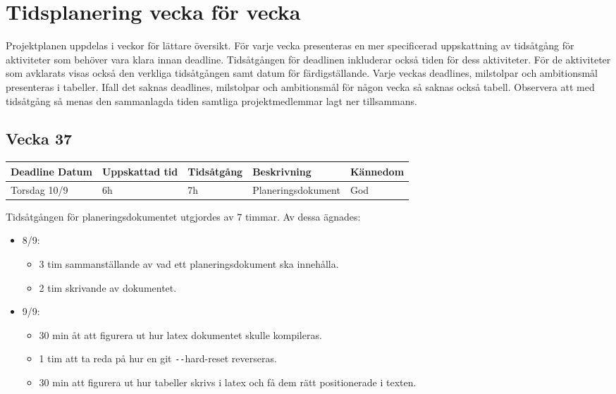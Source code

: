 \documentclass{TDP003mall}
\begin{document}
\section{Tidsplanering vecka för vecka}
Projektplanen uppdelas i veckor för lättare översikt. För varje vecka presenteras
 en mer specificerad uppskattning av tidsåtgång för aktiviteter som behöver vara
 klara innan deadline. Tidsåtgången för deadlinen inkluderar också tiden för dess
 aktiviteter. För de aktiviteter som avklarats visas också den verkliga tidsåtgången
 samt datum för färdigställande. Varje veckas deadlines, milstolpar och ambitionsmål presenteras
 i tabeller. Ifall det saknas deadlines, milstolpar och ambitionsmål för någon vecka så saknas också tabell. Observera att med tidsåtgång så menas den sammanlagda tiden samtliga projektmedlemmar lagt ner tillsammans.

\subsection{Vecka 37}
\begin{tabularx}{\linewidth}{|l|l|l|X|l|}
	\hline
	Deadline Datum & Uppskattad tid & Tidsåtgång & Beskrivning        & Kännedom \\ [0.5ex]
	\hline
	Torsdag 10/9   & 6h             & 7h         & Planeringsdokument & God      \\
	\hline
\end{tabularx}

Tidsåtgången för planeringsdokumentet utgjordes av 7 timmar. Av dessa ägnades:
\begin{itemize}
	\item 8/9:
	\begin{itemize}
		\item 3 tim sammanställande av vad ett planeringsdokument ska innehålla.
		\item 2 tim skrivande av dokumentet.
	\end{itemize}
	\item 9/9:
	\begin{itemize}
		\item 30 min åt att figurera ut hur latex dokumentet skulle kompileras.
		\item 1 tim att ta reda på hur en git \texttt{-{}-}hard-reset reverseras.
		\item 30 min att figurera ut hur tabeller skrivs i latex och få dem rätt positionerade i texten.\\
	\end{itemize}
      \end{itemize}
\end{document}
